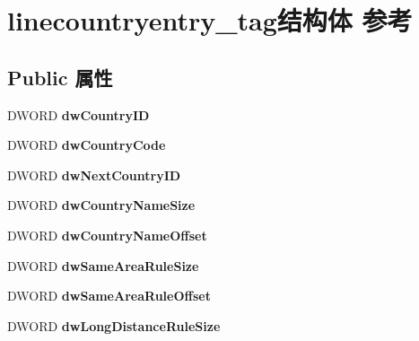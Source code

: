 \hypertarget{structlinecountryentry__tag}{}\section{linecountryentry\+\_\+tag结构体 参考}
\label{structlinecountryentry__tag}
\subsection*{Public 属性}
\begin{DoxyCompactItemize}
\item 
\mbox{\label{structlinecountryentry__tag_aa834c372daa4af49ec2efea64591aa2d}} 
D\+W\+O\+RD {\bfseries dw\+Country\+ID}
\item 
\mbox{\label{structlinecountryentry__tag_a9d5fb1a20b3280996462d6a036588167}} 
D\+W\+O\+RD {\bfseries dw\+Country\+Code}
\item 
\mbox{\label{structlinecountryentry__tag_aff0748c7fa1cfcd9f3f757767fefba91}} 
D\+W\+O\+RD {\bfseries dw\+Next\+Country\+ID}
\item 
\mbox{\label{structlinecountryentry__tag_a02639a70c80c864fe35d568a95409e6b}} 
D\+W\+O\+RD {\bfseries dw\+Country\+Name\+Size}
\item 
\mbox{\label{structlinecountryentry__tag_aed69509eaa51cf03bb557613423c8dd3}} 
D\+W\+O\+RD {\bfseries dw\+Country\+Name\+Offset}
\item 
\mbox{\label{structlinecountryentry__tag_abe4c77e2f53d006d767f369f6227d3dc}} 
D\+W\+O\+RD {\bfseries dw\+Same\+Area\+Rule\+Size}
\item 
\mbox{\label{structlinecountryentry__tag_a3c479c303adb865c718f90160da29a01}} 
D\+W\+O\+RD {\bfseries dw\+Same\+Area\+Rule\+Offset}
\item 
\mbox{\label{structlinecountryentry__tag_a137fb54b31f2432a07c6dd0eb8480e5d}} 
D\+W\+O\+RD {\bfseries dw\+Long\+Distance\+Rule\+Size}
\item 

\end{DoxyCompactItemize}
